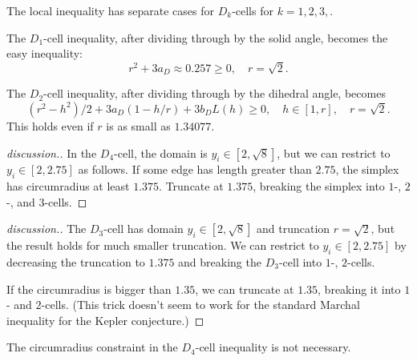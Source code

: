 \begin{calculation}
The local inequality  has separate cases for $D_k$-cells for
$k=1,2,3,$.
\end{calculation}

The $D_1$-cell inequality, after dividing through by the solid angle, becomes
the easy inequality:
\[
r^2 + 3 a_D \approx 0.257 \ge 0,\quad r = \sqrt2.
\]

The $D_2$-cell inequality, after dividing through by the dihedral angle, becomes
\[
 (r^2-h^2)/2 + 3 a_D (1-h/r)  + 3 b_D L(h) \ge 0, \quad h\in [1,r],\quad r = \sqrt2.
\]
This holds even if $r$ is as small as $1.34077$.

\begin{calculation}
\end{calculation}

\begin{proof}[discussion.]
In the $D_4$-cell, the domain is
$y_i\in[2,\sqrt8]$, but we can restrict to $y_i\in[2,2.75]$ as follows.
If some edge has length greater than $2.75$, the simplex has
circumradius at least $1.375$.  Truncate at $1.375$, breaking the
simplex into $1$-, $2$-, and $3$-cells.
\end{proof}

\begin{calculation}
\end{calculation}

\begin{proof}[discussion.]
The $D_3$-cell  has domain $y_i\in[2,\sqrt8]$ and
truncation $r=\sqrt2$, but the result holds for much smaller
truncation.  We can restrict to $y_i\in [2,2.75]$ by decreasing the
truncation to $1.375$ and breaking the $D_3$-cell into $1$-, $2$-cells.

If the circumradius is bigger than $1.35$, we can truncate at $1.35$, breaking
it into $1$- and $2$-cells.  (This trick doesn't seem to work for the standard Marchal
inequality for the Kepler conjecture.)
\end{proof}


The circumradius constraint in the $D_4$-cell inequality is not necessary.





